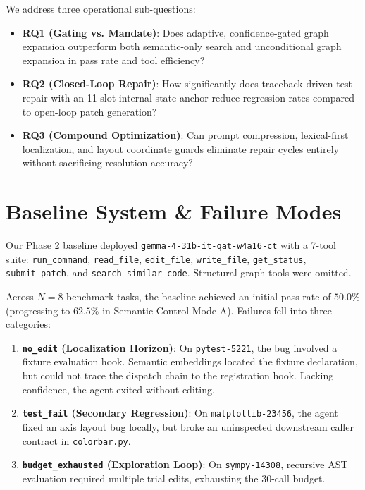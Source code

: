 \documentclass[10pt,twocolumn,letterpaper]{article}
\begin{document}
We address three operational sub-questions:
\begin{itemize}
    \item \textbf{RQ1 (Gating vs. Mandate)}: Does adaptive, confidence-gated graph expansion outperform both semantic-only search and unconditional graph expansion in pass rate and tool efficiency?
    \item \textbf{RQ2 (Closed-Loop Repair)}: How significantly does traceback-driven test repair with an 11-slot internal state anchor reduce regression rates compared to open-loop patch generation?
    \item \textbf{RQ3 (Compound Optimization)}: Can prompt compression, lexical-first localization, and layout coordinate guards eliminate repair cycles entirely without sacrificing resolution accuracy?
\end{itemize}

\section{Baseline System \& Failure Modes}
Our Phase 2 baseline deployed \texttt{gemma-4-31b-it-qat-w4a16-ct} with a 7-tool suite: \texttt{run\_command}, \texttt{read\_file}, \texttt{edit\_file}, \texttt{write\_file}, \texttt{get\_status}, \texttt{submit\_patch}, and \texttt{search\_similar\_code}. Structural graph tools were omitted.

Across $N=8$ benchmark tasks, the baseline achieved an initial pass rate of $50.0\%$ (progressing to $62.5\%$ in Semantic Control Mode A). Failures fell into three categories:
\begin{enumerate}
    \item \textbf{\texttt{no\_edit} (Localization Horizon)}: On \texttt{pytest-5221}, the bug involved a fixture evaluation hook. Semantic embeddings located the fixture declaration, but could not trace the dispatch chain to the registration hook. Lacking confidence, the agent exited without editing.
    \item \textbf{\texttt{test\_fail} (Secondary Regression)}: On \texttt{matplotlib-23456}, the agent fixed an axis layout bug locally, but broke an uninspected downstream caller contract in \texttt{colorbar.py}.
    \item \textbf{\texttt{budget\_exhausted} (Exploration Loop)}: On \texttt{sympy-14308}, recursive AST evaluation required multiple trial edits, exhausting the 30-call budget.
\end{enumerate}
\end{document}
